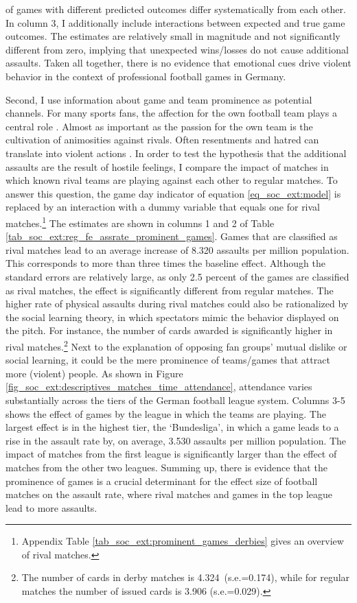 of games with different predicted outcomes differ systematically from each other. In column 3, I additionally include interactions between expected and true game outcomes. The estimates are relatively small in magnitude and not significantly different from zero, implying that unexpected wins/losses do not cause additional assaults. Taken all together, there is no evidence that emotional cues drive violent behavior in the context of professional football games in Germany.





Second, I use information about game and team prominence as potential channels. For many sports fans, the affection for the own football team plays a central role \citep{wann1993sports}. Almost as important as the passion for the own team is the cultivation of animosities against rivals. Often resentments and hatred can translate into violent actions \citep{nassauer2011hate}. In order to test the hypothesis that the additional assaults are the result of hostile feelings, I compare the impact of matches in which known rival teams are playing against each other to regular matches. To answer this question, the game day indicator of equation \ref{eq_soc_ext:model} is replaced by an interaction with a dummy variable that equals one for rival matches.\footnote{Appendix Table \ref{tab_soc_ext:prominent_games_derbies} gives an overview of rival matches.} The estimates are shown in columns 1 and 2 of Table \ref{tab_soc_ext:reg_fe_assrate_prominent_games}. Games that are classified as rival matches lead to an average increase of 8.320 assaults per million population. This corresponds to more than three times the baseline effect. Although the standard errors are relatively large, as only 2.5 percent of the games are classified as rival matches, the effect is significantly different from regular matches. The higher rate of physical assaults during rival matches could also be rationalized by the social learning theory, in which spectators mimic the behavior displayed on the pitch. For instance, the number of cards awarded is significantly higher in rival matches.\footnote{The number of cards in derby matches is 4.324\ (s.e.=0.174), while for regular matches the number of issued cards is 3.906 (s.e.=0.029).} Next to the explanation of opposing fan groups' mutual dislike or social learning, it could be the mere prominence of teams/games that attract more (violent) people. As shown in Figure \ref{fig_soc_ext:descriptives_matches_time_attendance}, attendance varies substantially across the tiers of the German football league system. Columns 3-5 shows the effect of games by the league in which the teams are playing. The largest effect is in the highest tier, the `Bundesliga', in which a game leads to a rise in the assault rate by, on average, 3.530 assaults per million population. The impact of matches from the first league is significantly larger than the effect of matches from the other two leagues.
Summing up, there is evidence that the prominence of games is a crucial determinant for the effect size of football matches on the assault rate, where rival matches and games in the top league lead to more assaults.


